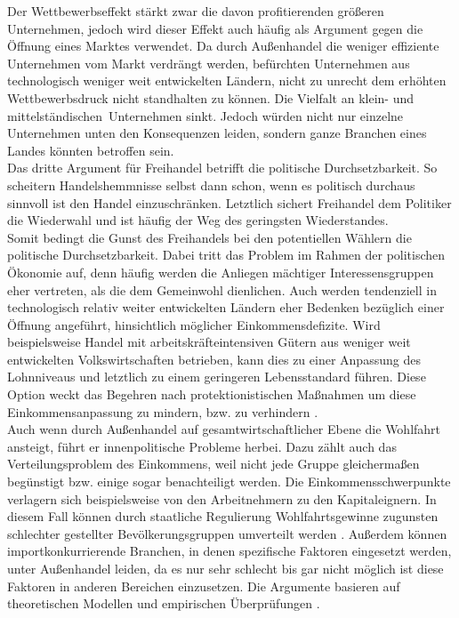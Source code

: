 %
Der Wettbewerbseffekt stärkt zwar die davon profitierenden größeren Unternehmen, jedoch wird dieser Effekt auch häufig als Argument gegen die Öffnung eines Marktes verwendet. Da durch Außenhandel die weniger effiziente Unternehmen vom Markt verdrängt werden, befürchten Unternehmen aus technologisch weniger weit entwickelten Ländern, nicht zu unrecht dem erhöhten Wettbewerbsdruck nicht standhalten zu können. Die Vielfalt an klein- und mittelständischen~Unternehmen sinkt. Jedoch würden nicht nur einzelne Unternehmen unten den Konsequenzen leiden, sondern ganze Branchen eines Landes könnten betroffen sein.\\
%
Das dritte Argument für Freihandel betrifft die politische Durchsetzbarkeit. So scheitern  Handelshemmnisse selbst dann schon, wenn  es politisch durchaus sinnvoll ist den Handel einzuschränken. Letztlich sichert Freihandel dem Politiker die Wiederwahl und ist häufig der Weg des geringsten Wiederstandes. \\
%
Somit bedingt die Gunst des Freihandels bei den potentiellen Wählern die politische Durchsetzbarkeit. Dabei tritt das Problem im Rahmen der politischen Ökonomie auf, denn häufig werden die Anliegen mächtiger Interessensgruppen eher vertreten, als die dem Gemeinwohl dienlichen. Auch werden tendenziell in technologisch relativ weiter entwickelten Ländern eher Bedenken bezüglich einer Öffnung angeführt, hinsichtlich möglicher Einkommensdefizite. Wird beispielsweise Handel mit arbeitskräfteintensiven Gütern aus weniger weit entwickelten Volkswirtschaften betrieben, kann dies zu einer Anpassung des Lohnniveaus und letztlich zu einem geringeren Lebensstandard führen. Diese Option weckt das Begehren nach protektionistischen Maßnahmen um diese Einkommensanpassung zu mindern, bzw. zu verhindern \cite[Kapitel 1]{Krugman.2015}.\\
%
Auch wenn durch Außenhandel auf gesamtwirtschaftlicher Ebene die Wohlfahrt ansteigt, führt er innenpolitische Probleme herbei. Dazu zählt auch das Verteilungsproblem des Einkommens, weil nicht jede Gruppe gleichermaßen begünstigt bzw. einige sogar benachteiligt werden. Die Einkommensschwerpunkte verlagern sich beispielsweise von den Arbeitnehmern zu den Kapitaleignern. In diesem Fall können durch staatliche Regulierung Wohlfahrtsgewinne zugunsten schlechter gestellter Bevölkerungsgruppen umverteilt werden \cite{Dixit.1980}. Außerdem können importkonkurrierende Branchen, in denen spezifische Faktoren eingesetzt werden, unter Außenhandel leiden, da es nur sehr schlecht bis gar nicht möglich ist diese Faktoren in anderen Bereichen einzusetzen.
Die Argumente basieren auf theoretischen Modellen und empirischen Überprüfungen \cite[Kapitel 1]{Krugman.2015}.
%

